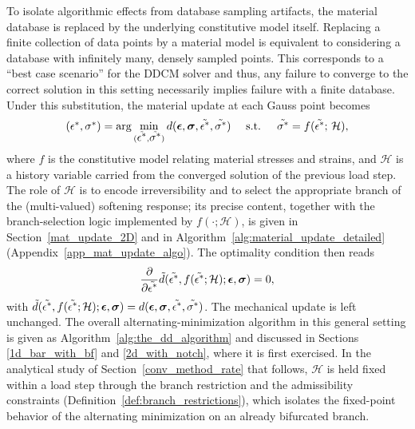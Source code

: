 \documentclass[10pt]{cas-sc}
\newenvironment{addedblock}
{\begingroup\color{blue!80}}
{\endgroup}
\begin{document}
\begin{addedblock}
To isolate algorithmic effects from database sampling artifacts, the material database is replaced by the underlying constitutive model itself. Replacing a finite collection of data points by a material model is equivalent to considering a database with infinitely many, densely sampled points. This corresponds to a ``best case scenario'' for the DDCM solver and thus, any failure to converge to the correct solution in this setting necessarily implies failure with a finite database. Under this substitution, the material update at each Gauss point becomes
\begin{equation}
	(\mbox{$\epsilon^*$},\mbox{$\sigma^*$}) = \arg \min_{(\tilde{\mbox{$\epsilon^*$}},\tilde{\mbox{$\sigma^*$}})} d(\mbox{\boldmath $\epsilon$},\mbox{\boldmath $\sigma$},\tilde{\mbox{$\epsilon^*$}},\tilde{\mbox{$\sigma^*$}}) \quad \text{   s.t.   }\quad \tilde{\mbox{$\sigma^*$}}=f(\tilde{\mbox{$\epsilon^*$}};\,\mathcal{H}),
\end{equation}
where $f$ is the constitutive model relating material stresses and strains, and $\mathcal{H}$ is a history variable carried from the converged solution of the previous load step. The role of $\mathcal{H}$ is to encode irreversibility and to select the appropriate branch of the (multi-valued) softening response; its precise content, together with the branch-selection logic implemented by $f(\cdot;\mathcal{H})$, is given in Section~\ref{mat_update_2D} and in Algorithm~\ref{alg:material_update_detailed} (Appendix~\ref{app_mat_update_algo}). The optimality condition then reads
\begin{equation}
	{\dfrac{\partial }{\partial \tilde{ \mbox{$\epsilon^*$}}}} \tilde{d}(\tilde{\mbox{$\epsilon^*$}},f(\tilde{\mbox{$\epsilon^*$}};\mathcal{H});\mbox{\boldmath $\epsilon$},\mbox{\boldmath $\sigma$})    =0,
\end{equation}
with $\tilde{d}(\tilde{\mbox{$\epsilon^*$}},f(\tilde{\mbox{$\epsilon^*$}};\mathcal{H});\mbox{\boldmath $\epsilon$},\mbox{\boldmath $\sigma$}) = d(\mbox{\boldmath $\epsilon$},\mbox{\boldmath $\sigma$},\tilde{\mbox{$\epsilon^*$}},\tilde{\mbox{$\sigma^*$}})$. The mechanical update is left unchanged. The overall alternating-minimization algorithm in this general setting is given as Algorithm~\ref{alg:the_dd_algorithm} and discussed in Sections \ref{1d_bar_with_bf} and \ref{2d_with_notch}, where it is first exercised. In the analytical study of Section~\ref{conv_method_rate} that follows, $\mathcal{H}$ is held fixed within a load step through the branch restriction and the admissibility constraints (Definition~\ref{def:branch_restrictions}), which isolates the fixed-point behavior of the alternating minimization on an already bifurcated branch.



\end{addedblock}
\end{document}
